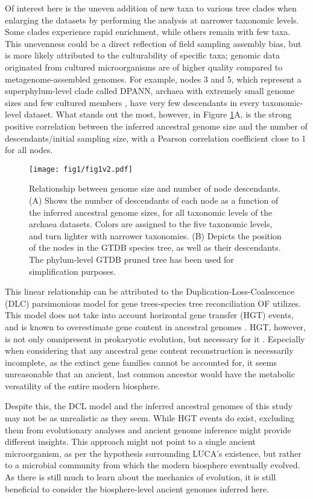 Of interest here is the uneven addition of new taxa to various tree clades when enlarging the datasets by performing the analysis at narrower taxonomic levels. Some clades experience rapid enrichment, while others remain with few taxa. This unevenness could be a direct reflection of field sampling assembly bias, but is more likely attributed to the culturability of specific taxa; genomic data originated from cultured microorganisms are of higher quality compared to metagenome-assembled genomes. For example, nodes 3 and 5, which represent a superphylum-level clade called DPANN, archaea with extremely small genome sizes and few cultured members \cite{dombrowski2019, dombrowski2020}, have very few descendants in every taxonomic-level dataset. What stands out the most, however, in Figure \ref{node_descendants_genomesize}A, is the strong positive correlation between the inferred ancestral genome size and the number of descendants/initial sampling size, with a Pearson correlation coefficient close to 1 for all nodes. 

\begin{figure}[H]
    \centering
    \texttt{[image: fig1/fig1v2.pdf]}
    \caption{Relationship between genome size and number of node descendants. (A) Shows the number of descendants of each node as a function of the inferred ancestral genome sizes, for all taxonomic levels of the archaea datasets. Colors are assigned to the five taxonomic levels, and turn lighter with narrower taxonomies. (B) Depicts the position of the nodes in the GTDB species tree, as well as their descendants. The phylum-level GTDB pruned tree has been used for simplification purposes. }
    \label{node_descendants_genomesize}
\end{figure}   

This linear relationship can be attributed to the Duplication-Loss-Coalescence (DLC) parsimonious model for gene trees-species tree reconciliation OF utilizes. This model does not take into account horizontal gene transfer (HGT) events, and is known to overestimate gene content in ancestral genomes \cite{doolittle2003}. HGT, however, is not only omnipresent in prokaryotic evolution, but necessary for it \cite{ochman2000}. Especially when considering that any ancestral gene content reconstruction is necessarily incomplete, as the extinct gene families cannot be accounted for, it seems unreasonable that an ancient, last common ancestor would have the metabolic versatility of the entire modern biosphere. 

Despite this, the DCL model and the inferred ancestral genomes of this study may not be as unrealistic as they seem. While HGT events do exist, excluding them from evolutionary analyses and ancient genome inference might provide different insights. This approach might not point to a single ancient microorganism, as per the hypothesis surrounding LUCA's existence, but rather to a microbial community from which the modern biosphere eventually evolved. As there is still much to learn about the mechanics of evolution, it is still beneficial to consider the biosphere-level ancient genomes inferred here.

